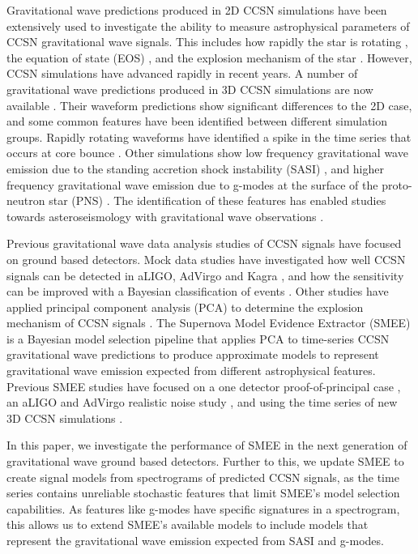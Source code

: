 \documentclass[letterpaper, aps, prd, twocolumn, superscriptaddress, showpacs, nofootinbib]{revtex4}
\begin{document}
Gravitational wave predictions produced in 2D CCSN simulations have been extensively used to investigate the ability to measure astrophysical parameters of CCSN gravitational wave signals. This includes how rapidly the star is rotating \cite{2014PhRvD..90d4001A}, the equation of state (EOS) \cite{2017PhRvD..95f3019R}, and the explosion mechanism of the star \cite{logue:12, powell:16b}. However, CCSN simulations have advanced rapidly in recent years. A number of gravitational wave predictions produced in 3D CCSN simulations are now available \cite{mueller:e12, scheidegger:10b, kuroda:16, andresen:16, 2017arXiv170107325Y, 2018arXiv181007638A}. Their waveform predictions show significant differences to the 2D case, and some common features have been identified between different simulation groups. Rapidly rotating waveforms have identified a spike in the time series that occurs at core bounce \cite{scheidegger:10b}. Other simulations show low frequency gravitational wave emission due to the standing accretion shock instability (SASI) \cite{2015PhRvD..92h4040Y, 2013ApJ...766...43M}, and higher frequency gravitational wave emission due to g-modes at the surface of the proto-neutron star (PNS) \cite{2013ApJ...766...43M}. The identification of these features has enabled studies towards asteroseismology with gravitational wave observations \cite{2018MNRAS.474.5272T, 2018arXiv180611366T}. 

Previous gravitational wave data analysis studies of CCSN signals have focused on ground based detectors. Mock data studies have investigated how well CCSN signals can be detected in aLIGO, AdVirgo and Kagra \cite{2015PhRvD..92l2001H, 2016PhRvD..93d2002G}, and how the sensitivity can be improved with a Bayesian classification of events \cite{2018arXiv180207255G}. Other studies have applied principal component analysis (PCA) to determine the explosion mechanism of CCSN signals \cite{heng:09, 2014InvPr..30k4008E, logue:12, powell:16b, 2017PhRvD..96l3013P}. The Supernova Model Evidence Extractor (SMEE) is a Bayesian model selection pipeline that applies PCA to time-series CCSN gravitational wave predictions to produce approximate models to represent gravitational wave emission expected from different astrophysical features. Previous SMEE studies have focused on a one detector proof-of-principal case \cite{logue:12}, an aLIGO and AdVirgo realistic noise study \cite{powell:16b}, and using the time series of new 3D CCSN simulations \cite{2017PhRvD..96l3013P}. 

In this paper, we investigate the performance of SMEE in the next generation of gravitational wave ground based detectors. Further to this, we update SMEE to create signal models from spectrograms of predicted CCSN signals, as the time series contains unreliable stochastic features that limit SMEE's model selection capabilities. As features like g-modes have specific signatures in a spectrogram, this allows us to extend SMEE's available models to include models that represent the gravitational wave emission expected from SASI and g-modes.   
\end{document}
